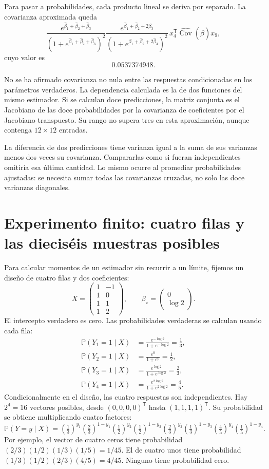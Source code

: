 \documentclass[11pt,a4paper]{article}
\newcommand{\Prob}{\mathbb P}
\newcommand{\T}{^{\mathsf T}}
\DeclareMathOperator{\Cov}{Cov}
\begin{document}
Para pasar a probabilidades, cada producto lineal se deriva
por separado. La covarianza aproximada queda
\[
\frac{e^{\widehat\beta_1+\widehat\beta_2+\widehat\beta_3}}
{(1+e^{\widehat\beta_1+\widehat\beta_2+\widehat\beta_3})^2}
\frac{e^{\widehat\beta_1+\widehat\beta_2+2\widehat\beta_3}}
{(1+e^{\widehat\beta_1+\widehat\beta_2+2\widehat\beta_3})^2}
\,x_4\T\widehat{\Cov}(\widehat\beta)x_9,
\]
cuyo valor es
\[
0.0537374948.
\]

No se ha afirmado covarianza no nula entre las respuestas
condicionadas en los parámetros verdaderos.
La dependencia calculada es la de dos funciones del mismo estimador.
Si se calculan doce predicciones, la matriz conjunta
es el Jacobiano de las doce probabilidades por la
covarianza de coeficientes por el Jacobiano transpuesto.
Su rango no supera tres en esta aproximación,
aunque contenga \(12\times12\) entradas.

La diferencia de dos predicciones tiene varianza
igual a la suma de sus varianzas menos dos veces
su covarianza. Compararlas como si fueran independientes
omitiría esa última cantidad.
Lo mismo ocurre al promediar probabilidades ajustadas:
se necesita sumar todas las covarianzas cruzadas,
no solo las doce varianzas diagonales.

\clearpage
\section{Experimento finito: cuatro filas y las dieciséis muestras posibles}\label{logit123}
Para calcular momentos de un estimador sin recurrir a un límite,
fijemos un diseño de cuatro filas y dos coeficientes:
\[
X=\begin{pmatrix}1&-1\\1&0\\1&1\\1&2\end{pmatrix},
\qquad
\beta_\star=\begin{pmatrix}0\\\log2\end{pmatrix}.
\]
El intercepto verdadero es cero.
Las probabilidades verdaderas se calculan usando cada fila:
\[
\begin{aligned}
\Prob(Y_1=1\mid X)&=\frac{e^{-\log2}}{1+e^{-\log2}}=\frac13,\\
\Prob(Y_2=1\mid X)&=\frac{e^0}{1+e^0}=\frac12,\\
\Prob(Y_3=1\mid X)&=\frac{e^{\log2}}{1+e^{\log2}}=\frac23,\\
\Prob(Y_4=1\mid X)&=\frac{e^{2\log2}}{1+e^{2\log2}}=\frac45.
\end{aligned}
\]
Condicionalmente en el diseño, las cuatro respuestas son
independientes. Hay \(2^4=16\) vectores posibles,
desde \((0,0,0,0)\T\) hasta \((1,1,1,1)\T\).
Su probabilidad se obtiene multiplicando cuatro factores:
\[
\Prob(Y=y\mid X)=
\left(\tfrac13\right)^{y_1}\left(\tfrac23\right)^{1-y_1}
\left(\tfrac12\right)^{y_2}\left(\tfrac12\right)^{1-y_2}
\left(\tfrac23\right)^{y_3}\left(\tfrac13\right)^{1-y_3}
\left(\tfrac45\right)^{y_4}\left(\tfrac15\right)^{1-y_4}.
\]
Por ejemplo, el vector de cuatro ceros tiene probabilidad
\((2/3)(1/2)(1/3)(1/5)=1/45\).
El de cuatro unos tiene probabilidad
\((1/3)(1/2)(2/3)(4/5)=4/45\).
Ninguno tiene probabilidad cero.
\end{document}
